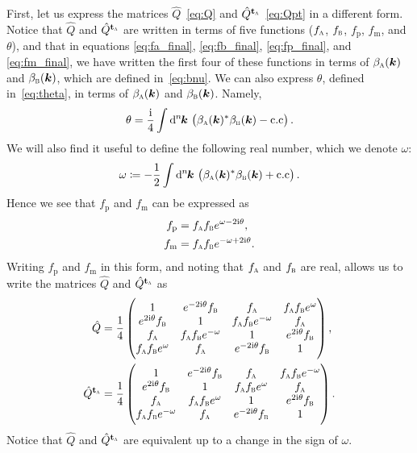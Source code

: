 \documentclass[pra,nofootinbib,floats,aps,twocolumn,tightenlines,superscriptaddress]{revtex4-1}
\renewcommand*\d[2][]{%
	\mathrm{d}%
	\ifx\relax#1\relax\else
	\rule{-0.02em}{1.5ex}^{#1}\rule{0.08em}{0ex}\!
	\fi
	#2\,
}
\newcommand{\ii}{\mathrm{i}}
\newcommand{\fa}{f_\textsc{a}}
\newcommand{\fb}{f_\textsc{b}}
\newcommand{\ba}{\beta_\textsc{a}(\bm k)}
\newcommand{\bb}{\beta_\textsc{b}(\bm k)}
\begin{document}
First, let us express the matrices $\hat{Q}$~\eqref{eq:Q} and $\hat{Q}^{{\text{\textbf{t}}}_\textsc{a}}$~\eqref{eq:Qpt} in a different form. Notice that $\hat{Q}$ and $\hat{Q}^{{\text{\textbf{t}}}_\textsc{a}}$ are written in terms of five functions ($\fa$, $\fb$, $f_\text{p}$, $f_\text{m}$, and $\theta$), and that in equations \eqref{eq:fa_final}, \eqref{eq:fb_final}, \eqref{eq:fp_final}, and \eqref{eq:fm_final}, we have written the first four of these functions in terms of $\ba$ and $\bb$, which are defined in~\eqref{eq:bnu}. We can also express $\theta$, defined in~\eqref{eq:theta}, in terms of $\ba$ and $\bb$. Namely,
\begin{equation}
\label{eq:theta_final}
    \theta
    =
    \frac{\ii}{4}\int\d[n]{\bm k}
    \left(
    \ba^*\bb
    -\text{c.c}
    \right).
\end{equation}
We will also find it useful to define the following real number, which we denote $\omega$:
\begin{equation}
\label{eq:omega}
    \omega 
    \coloneqq
    -\frac{1}{2}\int\d[n]{\bm k}
    \left(
    \ba^*\bb
    +\text{c.c}
    \right).
\end{equation}
Hence we see that $f_\text{p}$ and $f_\text{m}$ can be expressed as
\begin{align}
    f_\text{p}
    &=f_\textsc{a}f_\textsc{b}
    e^{\omega-2\ii\theta},
    \\
    f_\text{m}
    &=f_\textsc{a}f_\textsc{b}
    e^{-\omega+2\ii\theta}.
\end{align}
Writing $f_\text{p}$ and $f_\text{m}$ in this form, and noting that $f_\textsc{a}$ and $f_\textsc{b}$ are real, allows us to write the matrices $\hat{Q}$ and $\hat{Q}^{{\text{\textbf{t}}}_\textsc{a}}$ as
\begin{align}
\label{eq:Q2}
    \hat{Q}
    &=
    \frac{1}{4}
    \begin{pmatrix}
    1 & e^{-2\ii\theta} \fb & \fa & \fa\fb e^\omega
    \\
    e^{2\ii\theta} \fb & 1 & \fa\fb e^{-\omega} & \fa
    \\
    \fa & \fa\fb e^{-\omega} & 1 & e^{2\ii\theta} \fb
    \\
    \fa\fb e^\omega & \fa & e^{-2\ii\theta} \fb & 1
    \end{pmatrix},
    \\
\label{eq:Qpt2}
    \hat{Q}^{{\text{\textbf{t}}}_\textsc{a}}
    &=
    \frac{1}{4}
    \begin{pmatrix}
    1 & e^{-2\ii\theta} \fb & \fa & \fa\fb e^{-\omega}
    \\
    e^{2\ii\theta} \fb & 1 & \fa\fb e^{\omega} & \fa
    \\
    \fa & \fa\fb e^{\omega} & 1 & e^{2\ii\theta} \fb
    \\
    \fa\fb e^{-\omega} & \fa & e^{-2\ii\theta} \fb & 1
    \end{pmatrix}.
\end{align}
Notice that $\hat{Q}$ and $\hat{Q}^{{\text{\textbf{t}}}_\textsc{a}}$ are equivalent up to a change in the sign of $\omega$.
\end{document}
